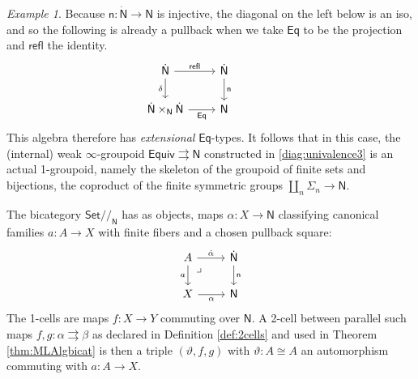\documentclass[12pt,reqno]{amsart}
\newcommand{\N}{\ensuremath{\mathbb{N}}}
\newcommand{\Set}{\ensuremath{\mathsf{Set}}}
\renewcommand{\to}{\ensuremath{\rightarrow}}
\newcommand{\tto}{\ensuremath{\rightrightarrows}}
\newcommand{\refl}{\mathsf{refl}}
\newcommand{\n}{\ensuremath{\mathsf{n}}}
\renewcommand{\N}{\ensuremath{\mathsf{N}}}
\newcommand{\NN}{\ensuremath{\dot{\mathsf{N}}}}
\newcommand{\pbcorner}{\arrow[dr,phantom,"\lrcorner" very near start, shift right=.5ex]} %
\theoremstyle{remark}
\newtheorem{example}[theorem]{Example}
\theoremstyle{definition}
\begin{document}
\begin{example}
Because $\n : \NN \to \N$ is injective, the diagonal on the left below is an iso, and so the following is already a pullback when we take $\mathsf{Eq}$ to be the projection and $\refl$ the identity.
 \begin{equation*}\label{diag:EqtypesN}
\begin{tikzcd}
	\NN \ar[r,"\refl"] \ar[d,swap,"\delta"] &  \NN \ar[d, "\n"]\\  
	\NN \times_\N \NN \ar[r, swap,"\mathsf{Eq}"] & \N
 \end{tikzcd}\qquad \qquad 
 \end{equation*}
This algebra therefore has \emph{extensional} $\mathsf{Eq}$-types. 
It follows that in this case, the (internal) weak $\infty$-groupoid $\mathsf{Equiv} \tto \N$ constructed in \eqref{diag:univalence3} is an actual 1-groupoid, namely the skeleton of the groupoid of finite sets and bijections, the coproduct of the finite symmetric groups $\coprod_n\Sigma_n\to\N$. 

The bicategory $\Set/\!/_\N$ has as objects, maps $\alpha: X\to \N$ classifying canonical families  $a :A \to X$ with finite fibers and a chosen pullback square:
\begin{equation}\label{eq:classifiedfamiliesN}
\begin{tikzcd}
	 A \ar[d, swap, "a"] \pbcorner \ar[r, "\dot{\alpha}"] & \NN \ar[d, "\n"] \\  
	X \ar[r, swap, "\alpha"] & \N 
 \end{tikzcd}
 \end{equation}
 The 1-cells are maps $f : X\to Y$ commuting over $\N$.  A 2-cell between parallel such maps $f, g : \alpha \tto \beta$ as declared in Definition \ref{def:2cells} and used in Theorem \ref{thm:MLAlgbicat} is then a triple $(\vartheta, f, g)$ with $\vartheta : A \cong A$ an automorphism commuting with $a : A \to X$. 


\end{example}
\end{document}
